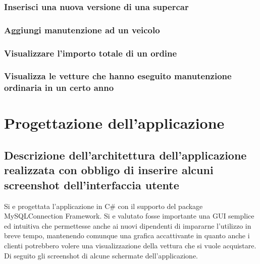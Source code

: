 \documentclass[11pt]{article}
\begin{document}
\subsubsection*{Inserisci una nuova versione di una supercar}

\subsubsection*{Aggiungi manutenzione ad un veicolo}

\subsubsection*{Visualizzare l’importo totale di un ordine}

\subsubsection*{Visualizza le vetture che hanno eseguito manutenzione ordinaria in un certo anno}

\section{Progettazione dell'applicazione}

\subsection{Descrizione dell'architettura dell'applicazione realizzata con
obbligo di inserire alcuni screenshot dell'interfaccia utente}

Si e progettata l'applicazione in C\# con il supporto del package
MySQLConnection Framework. Si e valutato fosse importante una GUI semplice ed
intuitiva che permettesse anche ai nuovi dipendenti di impararne l'utilizzo in
breve tempo, mantenendo comunque una grafica accattivante in quanto anche i
clienti potrebbero volere una visualizzazione della vettura che si vuole
acquistare.\\
Di seguito gli screenshot di alcune schermate dell'applicazione.
\end{document}
